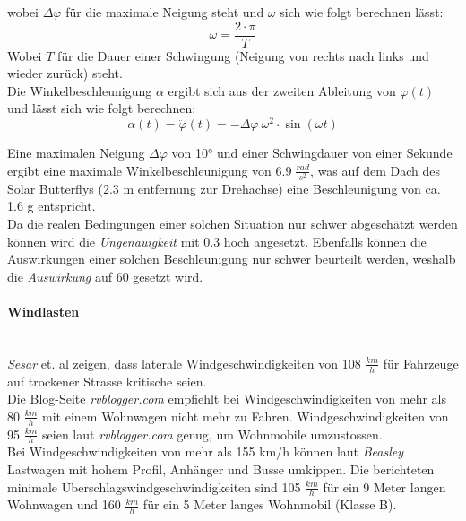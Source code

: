 \begin{description}
    wobei $\Delta\varphi$ für die maximale Neigung steht und $\omega$ sich wie folgt berechnen lässt:
    \begin{equation}
      \omega = \frac{2\cdot \pi}{T}
    \end{equation}
    Wobei $T$ für die Dauer einer Schwingung (Neigung von rechts nach links und wieder zurück) steht.\\
    Die Winkelbeschleunigung $\alpha$ ergibt sich aus der zweiten Ableitung von $\varphi(t)$ und lässt sich wie folgt berechnen:
    \begin{equation}
      \alpha(t) = \ddot \varphi(t) = -\Delta\varphi\:\omega^2 \cdot \sin \left(\omega t \right)
    \end{equation}

    Eine maximalen Neigung $\Delta \varphi$ von 10° und einer Schwingdauer von einer Sekunde ergibt eine maximale Winkelbeschleunigung von $6.9 \; \frac{rad}{s^2}$, was auf dem Dach des Solar Butterflys (2.3 m entfernung zur Drehachse) eine Beschleunigung von ca. 1.6 g entspricht.\\
    Da die realen Bedingungen einer solchen Situation nur schwer abgeschätzt werden können wird die \emph{Ungenauigkeit} mit 0.3 hoch angesetzt. Ebenfalls können die Auswirkungen einer solchen Beschleunigung nur schwer beurteilt werden, weshalb die \emph{Auswirkung} auf 60 gesetzt wird.
  \end{description}

  \paragraph{Windlasten}\mbox{}\\
  \emph{Sesar} et. al \cite{Wind.1} zeigen, dass laterale Windgeschwindigkeiten von 108 $\frac{km}{h}$ für Fahrzeuge auf trockener Strasse kritische seien.\\
  Die Blog-Seite \emph{rvblogger.com} \cite{Wind.2} empfiehlt bei Windgeschwindigkeiten von mehr als 80 $\frac{km}{h}$ mit einem Wohnwagen nicht mehr zu Fahren. Windgeschwindigkeiten von 95 $\frac{km}{h}$ seien laut \emph{rvblogger.com} genug, um Wohnmobile umzustossen.\\
  Bei Windgeschwindigkeiten von mehr als 155 km/h können laut \emph{Beasley} \cite{Wind.3} Lastwagen mit hohem Profil, Anhänger und Busse umkippen. Die berichteten minimale Überschlagswindgeschwindigkeiten sind 105 $\frac{km}{h}$ für ein 9 Meter langen Wohnwagen und 160 $\frac{km}{h}$ für ein 5 Meter langes Wohnmobil (Klasse B).

